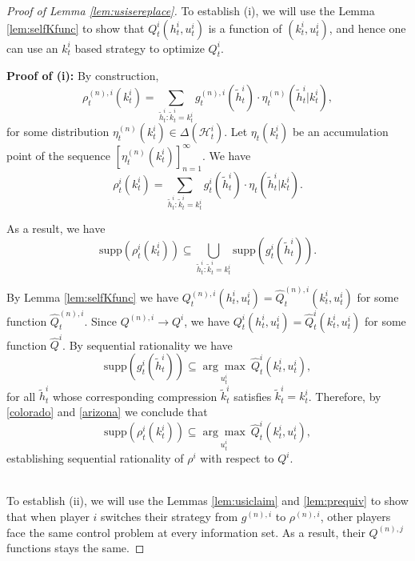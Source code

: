 \documentclass[pdflatex,sn-basic]{sn-jnl}
\newcommand{\Qfunc}{Q}
\newcommand{\comp}{k}
\theoremstyle{thmstyleone}%
\theoremstyle{thmstyletwo}%
\theoremstyle{thmstylethree}%
\begin{document}
\begin{appendices}
\begin{proof}[Proof of Lemma \ref{lem:usisereplace}]
	  To establish (i), we will use the Lemma \ref{lem:selfKfunc} to show that $\Qfunc_t^i(h_t^i, u_t^i)$ is a function of $(\comp_t^i, u_t^i)$, and hence one can use an $\comp_t^i$ based strategy to optimize $\Qfunc_t^i$.
	
	\textbf{Proof of (i):} By construction,
	\begin{equation}
		\rho_t^{(n), i}(\comp_t^i) = \sum_{\tilde{h}_t^i: \tilde{\comp}_t^i = \comp_t^i} g_t^{(n), i}(\tilde{h}_t^i) \cdot\eta_t^{(n)} (\tilde{h}_t^i|\comp_t^i),
	\end{equation}
	for some distribution $\eta_t^{(n)}(\comp_t^i) \in \Delta(\mathcal{H}_t^i)$. 
    Let $\eta_t(\comp_t^i)$ be an accumulation point of the sequence $[\eta_t^{(n)}(\comp_t^i)]_{n=1}^\infty$. We have
	\begin{equation}
		\rho_t^i(\comp_t^i) = \sum_{\tilde{h}_t^i: \tilde{\comp}_t^i = \comp_t^i} g_t^{i}(\tilde{h}_t^i)\cdot \eta_t (\tilde{h}_t^i|\comp_t^i).
	\end{equation}

	As a result, we have
	\begin{equation}\label{colorado}
		\mathrm{supp}(\rho_t^{i}(\comp_t^i)) \subseteq \bigcup_{\tilde{h}_t^i: \tilde{\comp}_t^i = \comp_t^i} \mathrm{supp}(g_t^{i}(\tilde{h}_t^i)).
	\end{equation}

    By Lemma \ref{lem:selfKfunc} we have $\Qfunc_t^{(n), i}(h_t^i, u_t^i) = \hat{\Qfunc}_t^{(n), i}(\comp_t^i, u_t^i)$ for some function $\hat{\Qfunc}_t^{(n), i}$. Since $\Qfunc^{(n), i} \rightarrow \Qfunc^i$, we have $\Qfunc_t^i(h_t^i, u_t^i) = \hat{\Qfunc}_t^{i}(\comp_t^i, u_t^i)$ for some function $\hat{\Qfunc}^{i}$. By sequential rationality we have
	\begin{equation}\label{arizona}
		\mathrm{supp}(g_t^{i}(\tilde{h}_t^i)) \subseteq \underset{u_t^i}{\arg\max}~ \hat{\Qfunc}_t^{i}(\comp_t^i, u_t^i),
	\end{equation}
	for all $\tilde{h}_t^i$ whose corresponding compression $\tilde{\comp}_t^i$ satisfies $\tilde{\comp}_t^i = \comp_t^i$. Therefore, by \eqref{colorado} and \eqref{arizona} we conclude that
	\begin{equation}
		\mathrm{supp}(\rho_t^{i}(\comp_t^i)) \subseteq \underset{u_t^i}{\arg\max}~ \hat{\Qfunc}_t^{i}(\comp_t^i, u_t^i),
	\end{equation}
	establishing sequential rationality of $\rho^i$ with respect to $\Qfunc^{i}$.\\~
	
	To establish (ii), we will use the Lemmas \ref{lem:usiclaim} and \ref{lem:prequiv} to show that when player $i$ switches their strategy from $g^{(n), i}$ to $\rho^{(n), i}$, other players face the same control problem at every information set. As a result, their $\Qfunc^{(n), j}$ functions stays the same.
	

\end{proof}
\end{appendices}
\end{document}
